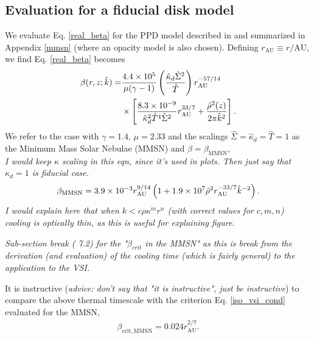 \subsection{Evaluation for a fiducial disk model}
We evaluate Eq. \ref{real_beta} for the PPD model
described in \cite{chiang10} and summarized in Appendix \ref{mmsn}
(where an opacity model is also chosen). Defining $r_\mathrm{AU}\equiv 
r/\mathrm{AU}$, we find Eq. \ref{real_beta} becomes
\begin{align}\label{beta_mmsn}
  \beta(r, z; \hat{k}) =
  &\frac{4.4\times10^5}{\mu(\gamma-1)}\left(\frac{\hat{\kappa}_d\hat{\Sigma}^2}{\hat{T}}\right)r_\mathrm{AU}^{-57/14}\notag\\ 
&\times\left[\frac{8.3\times10^{-9}}{\hat{\kappa}_d^2\hat{T}^4\hat{\Sigma}^2}r_\mathrm{AU}^{33/7}+\frac{\hat{\rho}^2(z)}{2\pi\hat{k}^2}\right].         
\end{align} 
We refer to the case with $\gamma=1.4$, $\mu=2.33$ and the scalings
$\hat{\Sigma}=\hat{\kappa}_d=\hat{T}=1$ as the Minimum Mass Solar
Nebulae (MMSN) and $\beta=\beta_\mathrm{MMSN}$, \\
\emph{I would keep $\kappa$ scaling in this eqn, since it's used in plots.  Then just say  that $\kappa_d = 1$ is fiducial case. }
\begin{align}\label{beta_mmsn_simp}
  \beta_\mathrm{MMSN} = 3.9\times10^{-3} r_\mathrm{AU}^{9/14}\left( 1 +
    1.9\times10^7\hat{\rho}^2r_\mathrm{AU}^{-33/7}\hat{k}^{-2}\right). 
\end{align}
\emph{I would explain here that when $k < c\rho \kappa^m r^n$ (with correct values for $c, m, n$) cooling is optically thin, as this is useful for explaining figure.}

\emph{Sub-section break  ( 7.2) for the "$\beta_{crit}$ in the MMSN" as this is break from the derivation (and evaluation) of the cooling time (which is fairly general) to the application to the VSI.}

It is instructive (\emph{advice: don't say that "it is instructive", just be instructive}) to compare the above thermal timescale 
with the criterion Eq. \ref{iso_vsi_cond} evaluated for the MMSN,     
\begin{align}\label{bcrit_mmsn}
  \beta_\mathrm{crit,MMSN} = 0.024r_\mathrm{AU}^{2/7}. 
\end{align}

